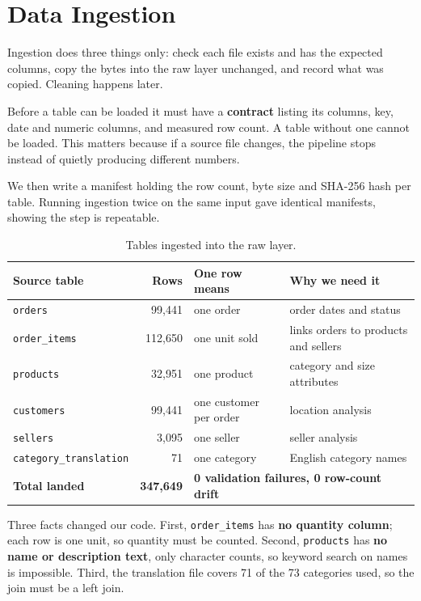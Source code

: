 \documentclass[11pt,a4paper]{article}
\newcommand{\code}[1]{\texttt{\small #1}}
\begin{document}
\section{Data Ingestion}
Ingestion does three things only: check each file exists and has the expected columns, copy the
bytes into the raw layer unchanged, and record what was copied. Cleaning happens later.

Before a table can be loaded it must have a \textbf{contract} listing its columns, key, date and
numeric columns, and measured row count. A table without one cannot be loaded. This matters
because if a source file changes, the pipeline stops instead of quietly producing different
numbers.

We then write a manifest holding the row count, byte size and SHA-256 hash per table. Running
ingestion twice on the same input gave identical manifests, showing the step is repeatable.

\begin{table}[h]
\centering\small
\begin{tabular}{@{}lrp{3.4cm}p{5.4cm}@{}}
\toprule
\textbf{Source table} & \textbf{Rows} & \textbf{One row means} & \textbf{Why we need it} \\
\midrule
\code{orders} & 99{,}441 & one order & order dates and status \\
\code{order\_items} & 112{,}650 & one unit sold & links orders to products and sellers \\
\code{products} & 32{,}951 & one product & category and size attributes \\
\code{customers} & 99{,}441 & one customer per order & location analysis \\
\code{sellers} & 3{,}095 & one seller & seller analysis \\
\code{category\_translation} & 71 & one category & English category names \\
\midrule
\textbf{Total landed} & \textbf{347{,}649} & \multicolumn{2}{l}{\textbf{0 validation failures, 0 row-count drift}} \\
\bottomrule
\end{tabular}
\caption{Tables ingested into the raw layer.}
\end{table}

Three facts changed our code. First, \code{order\_items} has \textbf{no quantity column}; each
row is one unit, so quantity must be counted. Second, \code{products} has \textbf{no name or
description text}, only character counts, so keyword search on names is impossible. Third, the
translation file covers 71 of the 73 categories used, so the join must be a left join.
\end{document}
